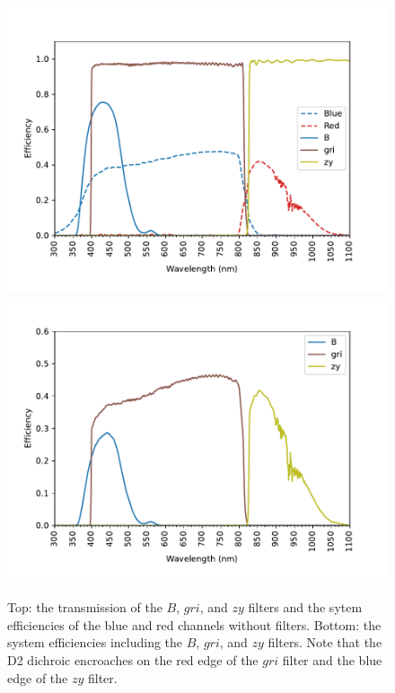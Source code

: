 \begin{figure}
\centering
\includegraphics[width=0.80\linewidth]{figure/filters-1.pdf}
\includegraphics[width=0.80\linewidth]{figure/system-filters-1.pdf}
\caption{Top: the transmission of the $B$, $gri$, and $zy$ filters and the sytem efficiencies of the blue and red channels without filters. Bottom: the system efficiencies including the $B$, $gri$, and $zy$ filters. Note that the D2 dichroic encroaches on the red edge of the $gri$ filter and the blue edge of the $zy$ filter.}
\label{figure:system-filters-others}
\end{figure}

